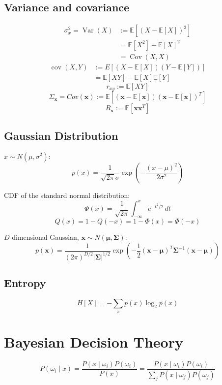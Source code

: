 \documentclass{article}
\begin{document}
\begin{multicols}{2}
\subsection{Variance and covariance}
\[\begin{split}
	\sigma_x^2 = \operatorname{Var}(X) &:= \mathbb{E}[(X - \mathbb{E}[X])^2] \\
	&= \mathbb{E}[X^2] - \mathbb{E}[X]^2 \\
	&= \operatorname{Cov}(X, X)
\end{split}\]
\[\begin{split}
	\operatorname{cov}(X, Y) &:= E{\left[(X - \mathbb{E}[X])(Y - \mathbb{E}[Y])\right]} \\
	&= \mathbb{E}[X Y] - \mathbb{E}[X] \mathbb{E}[Y]
\end{split}\]
\[r_{xy} := \mathbb{E}[X Y]\]
\[\Sigma_{\symbf{x}} = Cov(\symbf{x}) := \mathbb{E}\left[(\symbf{x} - \mathbb{E}[\symbf{x}])(\symbf{x} - \mathbb{E}[\symbf{x}])^T\right]\]
\[R_{\symbf{x}} := \mathbb{E}[\symbf{x} \symbf{x}^T]\]

\subsection{Gaussian Distribution}
$x \sim N(\mu, \sigma^2)$:
\[p(x) = \frac{1}{\sqrt{2 \pi} \sigma} \exp\left(-\frac{(x-\mu)^2}{2\sigma^2}\right)\]

CDF of the standard normal distribution:
\[\Phi(x) = \frac{1}{\sqrt{2\pi}} \int_{-\infty}^x e^{-t^2/2} \, dt\]
\[Q(x) = 1 - Q(-x) = 1 - \Phi(x) = \Phi(-x)\]

$D$-dimensional Gaussian, $\symbf{x} \sim N(\symbf{\mu}, \symbf{\Sigma})$:
\[p(\symbf{x}) = \frac{1}{(2 \pi)^{D/2} |\symbf{\Sigma}|^{1/2}} \exp\left(-\frac{1}{2}(\symbf{x}-\symbf{\mu})^T \symbf{\Sigma}^{-1} (\symbf{x}-\symbf{\mu}) \right)\]

\subsection{Entropy}
\[H[X] = - \sum_x p(x) \log_2 p(x)\]


\section{Bayesian Decision Theory}

\[P(\omega_i \mid x) = \frac{P(x \mid \omega_i) P(\omega_i)}{P(x)} = \frac{P(x \mid \omega_i) P(\omega_i)}{\sum\limits_j P(x \mid \omega_j) P(\omega_j)}\]


\end{multicols}
\end{document}
